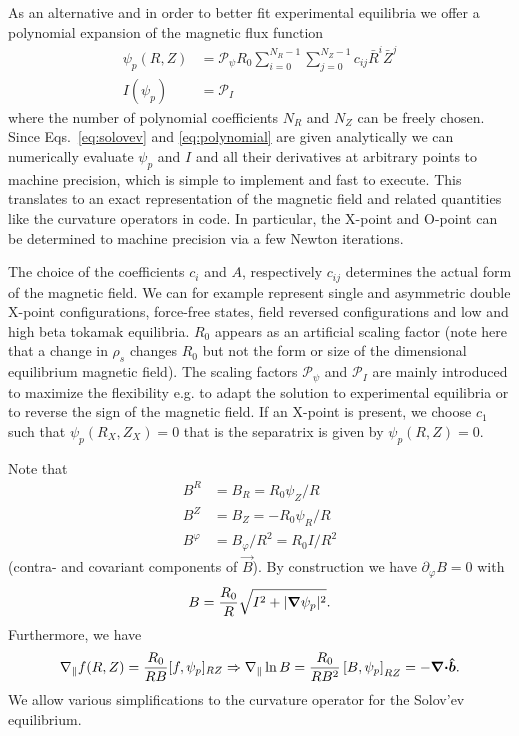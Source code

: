 As an alternative and in order to better fit experimental equilibria we offer
a polynomial expansion of the magnetic flux function
\begin{subequations}
\label{eq:polynomial}
\begin{align}
    \psi_p(R,Z) &= \mathcal P_\psi R_0\sum_{i=0}^{N_R-1}\sum_{j=0}^{N_Z-1} c_{ij}\bar R^i\bar Z^j\\
   I(\psi_p) &= \mathcal P_I
\end{align}
\end{subequations}
where the number of polynomial coefficients $N_R$ and $N_Z$ can be freely chosen.
Since Eqs.~\eqref{eq:solovev} and \eqref{eq:polynomial} are given analytically we can numerically evaluate $\psi_p$ and $I$
and all their derivatives
at arbitrary points to machine precision, which is simple to implement and fast to execute.
This translates to an exact representation of the magnetic field and related
quantities like the curvature operators in code. In particular,
the X-point and O-point can be determined to machine
precision via a few Newton iterations.

The choice of the coefficients \(c_{i}\) and \(A\), respectively $c_{ij}$ determines the actual form
of the magnetic field.
We can for example represent single and asymmetric double X-point configurations, force-free states,
field reversed configurations and low and high beta tokamak equilibria.
$R_0$ appears as an artificial scaling factor
(note here that a change in $\rho_s$ changes $R_0$ but not the form or size of
the dimensional equilibrium magnetic field).
The scaling factors $\mathcal P_\psi$ and $\mathcal P_I$ are mainly introduced to maximize the flexibility e.g. to adapt the solution to experimental equilibria or to reverse the sign of the magnetic field.
If an X-point is present, we choose $c_1$ such that
$\psi_p(R_X, Z_X) = 0$ that is the separatrix is given by $\psi_p(R,Z) = 0$.

Note that
\begin{align}
    B^R&=B_R = R_0\psi_Z/R \\
    B^Z&=B_Z = - R_0\psi_R/R \\
    B^\varphi &= B_\varphi/R^2 = R_0I/R^2
\end{align}
(contra- and covariant components of $\vec B$).
By construction we have $\partial_\varphi B = 0$ with
\begin{align}
  B = \frac{R_0}{R}\sqrt{ {I^2 + |{\boldsymbol{\nabla}} \psi_p|^2}}.
    \label{}
\end{align}
Furthermore, we have
\begin{align}
  \nabla_\parallel f(R,Z) = \frac{R_0}{RB}[f,\psi_p]_{RZ}\Rightarrow \nabla_\parallel \ln B = \frac{R_0}{RB^2}\left[B, \psi_p\right]_{RZ} = -{\boldsymbol{{\boldsymbol{\nabla}}\cdot}}\bm{\hat{b}}.
\end{align}
We allow various simplifications to the curvature operator
for the Solov'ev equilibrium.

